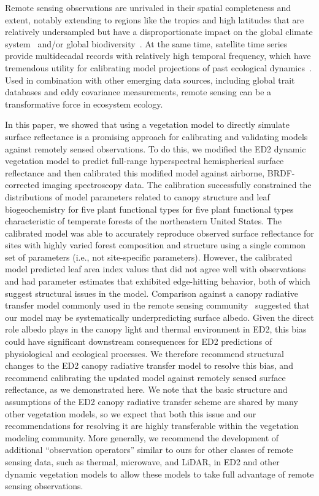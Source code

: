 \conclusions  %

Remote sensing observations are unrivaled in their spatial completeness and extent, notably extending to regions like the tropics and high latitudes that are relatively undersampled but have a disproportionate impact on the global climate system~\citep{schimel2015observing} and/or global biodiversity~\citep{jetz_2016_monitoring}.
At the same time, satellite time series provide multidecadal records with relatively high temporal frequency, which have tremendous utility for calibrating model projections of past ecological dynamics~\citep{kennedy2014bringing, pasquarella2016imagery}.
Used in combination with other emerging data sources, including global trait databases and eddy covariance measurements, remote sensing can be a transformative force in ecosystem ecology.

In this paper, we showed that using a vegetation model to directly simulate surface reflectance is a promising approach for calibrating and validating models against remotely sensed observations.
To do this, we modified the ED2 dynamic vegetation model to predict full-range hyperspectral hemispherical surface reflectance and then calibrated this modified model against airborne, BRDF-corrected imaging spectroscopy data.
The calibration successfully constrained the distributions of model parameters related to canopy structure and leaf biogeochemistry for five plant functional types for five plant functional types characteristic of temperate forests of the northeastern United States.
The calibrated model was able to accurately reproduce observed surface reflectance for sites with highly varied forest composition and structure using a single common set of parameters (i.e., not site-specific parameters).
However, the calibrated model predicted leaf area index values that did not agree well with observations and had parameter estimates that exhibited edge-hitting behavior, both of which suggest structural issues in the model.
Comparison against a canopy radiative transfer model commonly used in the remote sensing community~\citep[PRO4SAIL,][]{verhoef2007coupled} suggested that our model may be systematically underpredicting surface albedo.
Given the direct role albedo plays in the canopy light and thermal environment in ED2, this bias could have significant downstream consequences for ED2 predictions of physiological and ecological processes.
We therefore recommend structural changes to the ED2 canopy radiative transfer model to resolve this bias, and recommend calibrating the updated model against remotely sensed surface reflectance, as we demonstrated here.
We note that the basic structure and assumptions of the ED2 canopy radiative transfer scheme are shared by many other vegetation models,
so we expect that both this issue and our recommendations for resolving it are highly transferable within the vegetation modeling community.
More generally, we recommend the development of additional ``observation operators'' similar to ours for other classes of remote sensing data, such as thermal, microwave, and LiDAR, in ED2 and other dynamic vegetation models to allow these models to take full advantage of remote sensing observations.
